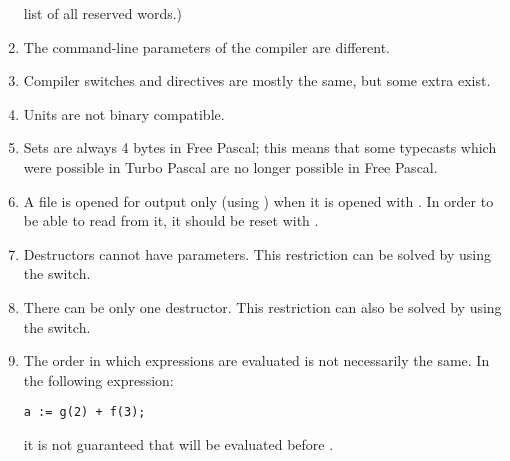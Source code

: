 \begin{enumerate}
list of all reserved words.)
\item The command-line parameters of the compiler are different.
\item Compiler switches and directives are mostly the same, but some extra
exist.
\item Units are not binary compatible.
\item Sets are always 4 bytes in Free Pascal; this means that some typecasts
which were possible in Turbo Pascal are no longer possible in Free Pascal.
\item A file is opened for output only (using ) when it is
opened with . In order to be able to read from it, it should
be reset with .
\item Destructors cannot have parameters. This restriction can be solved by
using the  switch.
\item There can be only one destructor. This restriction can also be
solved by using the  switch.
\item The order in which expressions are evaluated is not necessarily the
same. In the following expression:
\begin{verbatim}
a := g(2) + f(3);
\end{verbatim}
it is not guaranteed that  will be evaluated before .
\end{enumerate}

